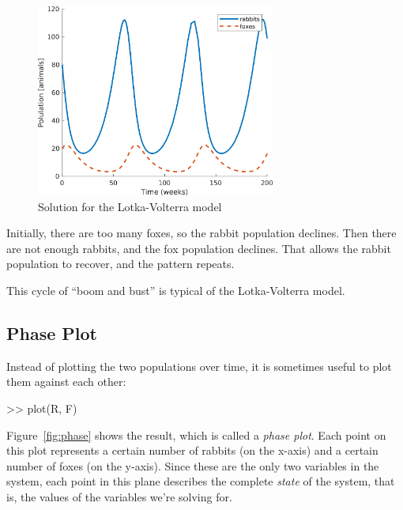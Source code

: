 \begin{figure}[h]
\centerline{\includegraphics[width=0.7\textwidth]{../code/chap_matrices/lotka_time.png}}
\caption{Solution for the Lotka-Volterra model}
\label{fig:lotka}
\end{figure}


Initially, there are too many foxes, so the rabbit population declines.  Then there are not enough rabbits, and the fox population declines.  That allows the rabbit population to recover, and the pattern repeats.

This cycle of ``boom and bust'' is typical of the Lotka-Volterra model.


\subsection{Phase Plot}

Instead of plotting the two populations over time, it is sometimes useful to plot them against each other:

\begin{code}
>> plot(R, F)
\end{code}

Figure~\ref{fig:phase} shows the result, which is called a \emph{phase plot}.
Each point on this plot represents a certain number of rabbits (on the
x-axis) and a certain number of foxes (on the y-axis).
Since these are the only two variables in the system, each point in
this plane describes the complete \emph{state} of the system, that is, the values of
the variables we're solving for.

